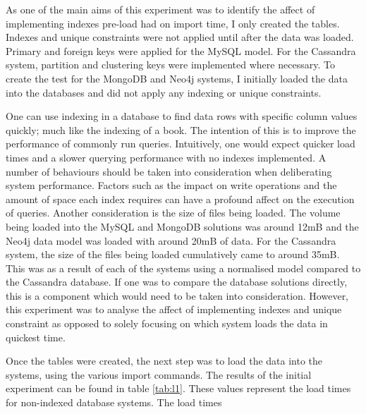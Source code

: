 As one of the main aims of this experiment was to identify the affect of implementing indexes pre-load had on import time, I only created the tables. Indexes and unique constraints were not applied until after the data was loaded. Primary and foreign keys were applied for the MySQL model. For the Cassandra system, partition and clustering keys were implemented where necessary. To create the test for the MongoDB and Neo4j systems, I initially loaded the data into the databases and did not apply any indexing or unique constraints.

One can use indexing in a database to find data rows with specific column values quickly; much like the indexing of a book. The intention of this is to improve the performance of commonly run queries. Intuitively, one would expect quicker load times and a slower querying performance with no indexes implemented. A number of behaviours should be taken into consideration when deliberating system performance. Factors such as the impact on write operations and the amount of space each index requires can have a profound affect on the execution of queries. Another consideration is the size of files being loaded. The volume being loaded into the MySQL and MongoDB solutions was around 12mB and the Neo4j data model was loaded with around 20mB of data. For the Cassandra system, the size of the files being loaded cumulatively came to around 35mB. This was as a result of each of the systems using a normalised model compared to the Cassandra database. If one was to compare the database solutions directly, this is a component which would need to be taken into consideration. However, this experiment was to analyse the affect of implementing indexes and unique constraint as opposed to solely focusing on which system loads the data in quickest time.

Once the tables were created, the next step was to load the data into the systems, using the various import commands. The results of the initial experiment can be found in table \ref{tab:l1}. These values represent the load times for non-indexed database systems. The load times 

